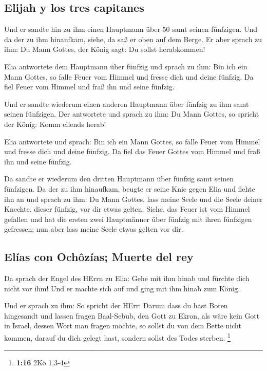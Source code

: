 \hypertarget{elijah-y-los-tres-capitanes}{%
\subsection{Elijah y los tres
capitanes}\label{elijah-y-los-tres-capitanes}}

 Und er sandte hin zu ihm einen Hauptmann über 50 samt
seinen fünfzigen. Und da der zu ihm hinaufkam, siehe, da saß er oben auf
dem Berge. Er aber sprach zu ihm: Du Mann Gottes, der König sagt: Du
sollst herabkommen!

 Elia antwortete dem Hauptmann über fünfzig und sprach zu
ihm: Bin ich ein Mann Gottes, so falle Feuer vom Himmel und fresse dich
und deine fünfzig. Da fiel Feuer vom Himmel und fraß ihn und seine
fünfzig.

 Und er sandte wiederum einen anderen Hauptmann über
fünfzig zu ihm samt seinen fünfzigen. Der antwortete und sprach zu ihm:
Du Mann Gottes, so spricht der König: Komm eilends herab!

 Elia antwortete und sprach: Bin ich ein Mann Gottes, so
falle Feuer vom Himmel und fresse dich und deine fünfzig. Da fiel das
Feuer Gottes vom Himmel und fraß ihn und seine fünfzig.

 Da sandte er wiederum den dritten Hauptmann über fünfzig
samt seinen fünfzigen. Da der zu ihm hinaufkam, beugte er seine Knie
gegen Elia und flehte ihn an und sprach zu ihm: Du Mann Gottes, lass
meine Seele und die Seele deiner Knechte, dieser fünfzig, vor dir etwas
gelten.  Siehe, das Feuer ist vom Himmel gefallen und hat
die ersten zwei Hauptmänner über fünfzig mit ihren fünfzigen gefressen;
nun aber lass meine Seele etwas gelten vor dir.

\hypertarget{eluxedas-con-ochuxf4zuxedas-muerte-del-rey}{%
\subsection{Elías con Ochôzías; Muerte del
rey}\label{eluxedas-con-ochuxf4zuxedas-muerte-del-rey}}

 Da sprach der Engel des HErrn zu Elia: Gehe mit ihm
hinab und fürchte dich nicht vor ihm! Und er machte sich auf und ging
mit ihm hinab zum König.

 Und er sprach zu ihm: So spricht der HErr: Darum dass du
hast Boten hingesandt und lassen fragen Baal-Sebub, den Gott zu Ekron,
als wäre kein Gott in Israel, dessen Wort man fragen möchte, so sollst
du von dem Bette nicht kommen, darauf du dich gelegt hast, sondern
sollst des Todes sterben. \footnote{\textbf{1:16} 2Kö 1,3-4}

